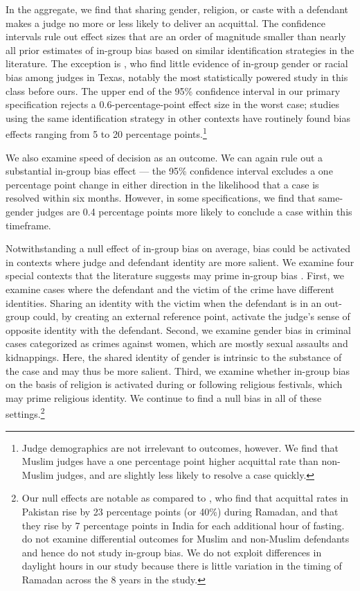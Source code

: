 \documentclass[12pt,english]{article}
\begin{document}
In the aggregate, we find that sharing gender, religion, or caste with a defendant makes a judge no more or less likely to deliver an acquittal. The confidence intervals rule out effect sizes that are an order of magnitude smaller than nearly all prior estimates of in-group bias based on similar identification strategies in the literature. The exception is \cite{lim2016judges}, who find little evidence of in-group gender or racial bias among judges in Texas, notably the most statistically powered study in this class before ours. The upper end of the 95\% confidence interval in our primary specification rejects a 0.6-percentage-point effect size in the worst case; studies using the same identification strategy in other contexts have routinely found bias effects ranging from 5 to 20 percentage points.\footnote{Judge demographics are not irrelevant to outcomes, however. We find that Muslim judges have a one percentage point higher acquittal rate than non-Muslim judges, and are slightly less likely to resolve a case quickly.} 

We also examine speed of decision as an outcome. We can again rule out a substantial in-group bias effect --- the 95\% confidence interval excludes a one percentage point change in either direction in the likelihood that a case is resolved within six months. However, in some specifications, we find that same-gender judges are 0.4 percentage points more likely to conclude a case within this timeframe.

Notwithstanding a null effect of in-group bias on average, bias could be activated in contexts where judge and defendant identity are more salient. We examine four special contexts that the literature suggests may prime in-group bias \citep{mullen1992ingroup,ShayoZussman2011QJE,AnwarBayerHjalmarsson2012TQJoE,Mehmood2020}. First, we examine cases where the defendant and the victim of the crime have different identities. Sharing an identity with the victim when the defendant is in an out-group could, by creating an external reference point, activate the judge's sense of opposite identity with the defendant. Second, we examine gender bias in criminal cases categorized as crimes against women, which are mostly sexual assaults and kidnappings. Here, the shared identity of gender is intrinsic to the substance of the case and may thus be more salient. Third, we examine whether in-group bias on the basis of religion is activated during or following religious festivals, which may prime religious identity. We continue to find a null bias in all of these settings.\footnote{Our null effects are notable as compared to \citet{Mehmood2020}, who find that acquittal rates in Pakistan rise by 23 percentage points (or 40\%) during Ramadan, and that they rise by 7 percentage points in India for each additional hour of fasting. \citet{Mehmood2020} do not examine differential outcomes for Muslim and non-Muslim defendants and hence do not study in-group bias. We do not exploit differences in daylight hours in our study because there is little variation in the timing of Ramadan across the 8 years in the study.}
\end{document}
